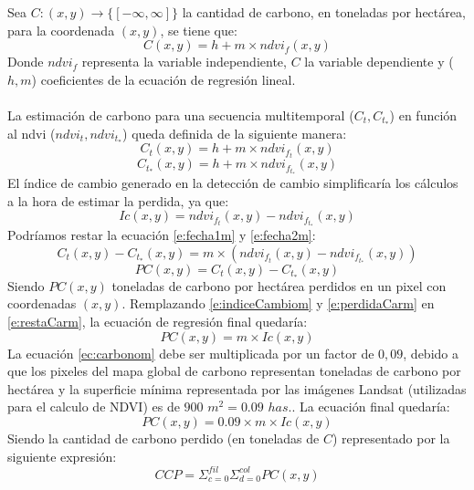 Sea $ C:(x,y) \longrightarrow \{ [-\infty,\infty]\}$ la cantidad de carbono, en toneladas por hect\'area, para la coordenada $ (x,y) $, se tiene que: 
\begin{equation}\label{ec:regreLinelCarb}
C(x,y)=h+m \times ndvi_{f}(x,y)
\end{equation}
Donde $ ndvi_{f} $ representa la variable independiente, $ C $ la variable dependiente y ($ h , m $) coeficientes de la ecuaci\'on de regresi\'on lineal. \\~\\
La estimaci\'on de carbono para una secuencia multitemporal ($ C_{t},C_{t_{*}} $) en funci\'on al ndvi ($ ndvi_{t},ndvi_{t_{*}} $) queda definida de la siguiente manera:
\begin{equation}
\label{e:fecha1m}
C_{t}(x,y)=h+m \times ndvi_{f_{t}}(x,y)
\end{equation}
\begin{equation}
\label{e:fecha2m}
C_{t_{*}}(x,y)=h+m \times ndvi_{f_{t_{*}}}(x,y)
\end{equation}
 El \'indice de cambio generado en la detecci\'on de cambio simplificar\'ia los c\'alculos a la hora de estimar la perdida, ya que:
 \begin{equation}
 \label{e:indiceCambiom}
 Ic(x,y)=ndvi_{f_{t}}(x,y) - ndvi_{f_{t_{*}}}(x,y)
 \end{equation}		
 Podr\'iamos restar la ecuaci\'on \ref{e:fecha1m} y \ref{e:fecha2m}:
 \begin{equation}
 \label{e:restaCarm}
C_{t}(x,y) - C_{t_{*}}(x,y)= m \times (ndvi_{f_{t}}(x,y) - ndvi_{f_{t_{*}}}(x,y))
 \end{equation}		
 \begin{equation}
 \label{e:perdidaCarm}
 PC(x,y)= C_{t}(x,y) - C_{t_{*}}(x,y)
 \end{equation}		
 Siendo $ PC(x,y)$ toneladas de carbono por hect\'area perdidos en un pixel con coordenadas $ (x,y) $. Remplazando \ref{e:indiceCambiom} y \ref{e:perdidaCarm} en \ref{e:restaCarm}, la ecuaci\'on de regresi\'on final quedar\'ia:
 \begin{equation}\label{ec:carbonom}
 PC(x,y) = m \times Ic(x,y)
 \end{equation}
 La ecuaci\'on \ref{ec:carbonom} debe ser multiplicada por un factor de $ 0,09 $, debido a que los pixeles del mapa global de carbono representan toneladas de carbono por hect\'area \cite{saatchi2011benchmark} y la superficie m\'inima representada por las im\'agenes Landsat (utilizadas para el calculo de NDVI) es de $ 900$  $m^{2}=0.09 $  $has. $. La ecuaci\'on final quedar\'ia:
 \begin{equation}\label{ec:carbonoFinalm}
 PC(x,y) = 0.09 \times m \times Ic(x,y)
 \end{equation}
 Siendo la cantidad de carbono perdido (en toneladas de $ C $) representado por la siguiente expresi\'on:
 \begin{equation}\label{ec:carbonoFinalsumatoriam}
 CCP = \Sigma_{c=0}^{fil}\Sigma_{d=0}^{col} PC(x,y)
 \end{equation}
  

